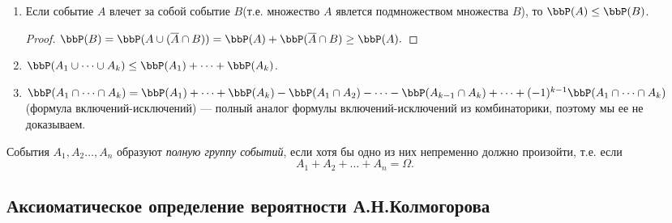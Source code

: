 \begin{enumerate}
\item
Если событие $A$ влечет за собой событие $B$(т.е. множество $A$ явлется подмножеством множества $B$), то $\bbP(A)\le\bbP(B)$.
\begin{proof}
$\bbP(B)=\bbP(A\cup (\overline{A}\cap B))=\bbP(A)+\bbP(\overline{A}\cap B)\ge \bbP(A).$
\end{proof}

\item
$\bbP(A_1\cup\dots\cup A_k) \le \bbP(A_1)+\dots+\bbP(A_k)$.

\item
$\bbP(A_1\cap\dots\cap A_k)= \bbP(A_1)+\dots+\bbP(A_k)-\bbP(A_1\cap A_2)-\dots -\bbP(A_{k-1}\cap A_{k})+ \dots + (-1)^{k-1}\bbP(A_1\cap\dots\cap A_k)  $ (формула включений-исключений) --- полный аналог формулы включений-исключений из комбинаторики, поэтому мы ее не доказываем.
\end{enumerate}

\begin{defn}
События $A_1,A_2\dots,A_n$ образуют \textit{полную группу событий}, если хотя бы одно из них непременно должно произойти, т.е. если
$$
A_1+A_2+\dots+A_n=\Omega.
$$
\end{defn}

\subsection{Аксиоматическое определение вероятности А.Н.Колмогорова}

